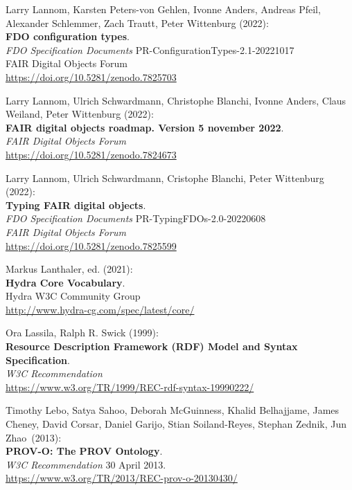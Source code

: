 \begin{thebibliography}{9}
Larry Lannom, Karsten Peters-von Gehlen, Ivonne Anders, Andreas Pfeil,
Alexander Schlemmer, Zach Trautt, Peter Wittenburg (2022):\\
\textbf{{FDO} configuration types}. \\
\emph{FDO Specification Documents} PR-ConfigurationTypes-2.1-20221017 \\
FAIR Digital Objects Forum \\
\url{https://doi.org/10.5281/zenodo.7825703}

Larry Lannom, Ulrich Schwardmann, Christophe Blanchi, Ivonne Anders,
Claus Weiland, Peter Wittenburg (2022): \\
\textbf{FAIR digital objects roadmap. Version 5 november 2022}.\\
\emph{FAIR Digital Objects Forum}\\
\url{https://doi.org/10.5281/zenodo.7824673}

Larry Lannom, Ulrich Schwardmann, Cristophe Blanchi, Peter Wittenburg (2022): \\
\textbf{Typing {FAIR} digital objects}. \\
\emph{FDO Specification Documents} PR-TypingFDOs-2.0-20220608 \\
\emph{FAIR Digital Objects Forum}\\
\url{https://doi.org/10.5281/zenodo.7825599}

Markus Lanthaler, ed. (2021):\\
\textbf{Hydra Core Vocabulary}.\\
Hydra W3C Community Group\\
\url{http://www.hydra-cg.com/spec/latest/core/} 

Ora Lassila, Ralph R. Swick (1999): \\
\textbf{Resource {Description Framework} ({RDF}) {Model} and {Syntax Specification}}. \\
\emph{W3C Recommendation}\\
\url{https://www.w3.org/TR/1999/REC-rdf-syntax-19990222/}  

Timothy Lebo, Satya Sahoo, Deborah McGuinness, Khalid Belhajjame, 
James Cheney, David Corsar, Daniel Garijo, Stian Soiland-Reyes, 
Stephan Zednik, Jun Zhao~(2013):\\
\textbf{PROV-O: The PROV Ontology}.\\
\emph{W3C Recommendation} 30 April 2013.\\
\url{https://www.w3.org/TR/2013/REC-prov-o-20130430/}


\end{thebibliography}
